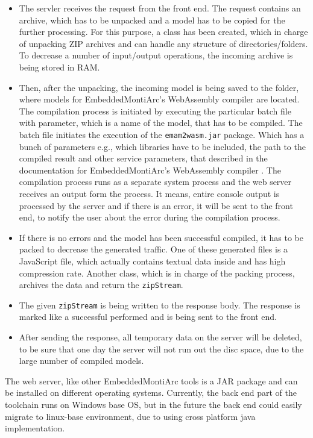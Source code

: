 \begin{itemize}
    \item The servler receives the request from the front end. The request contains an archive, which has to be unpacked and a model has to be copied for the further processing. For this purpose, a class has been created, which in charge of unpacking ZIP archives and can handle any structure of directories/folders. To decrease a number of input/output operations, the incoming archive is being stored in RAM.
    \item Then, after the unpacking, the incoming model is being saved to the folder, where models for EmbeddedMontiArc's WebAssembly compiler are located. The compilation process is initiated by executing the particular batch file with parameter, which is a name of the model, that has to be compiled. The batch file initiates the execution of the \texttt{emam2wasm.jar} package. Which has a bunch of parameters e.g., which libraries have to be included, the path to the compiled result and other service parameters, that described in the documentation for EmbeddedMontiArc's WebAssembly compiler \cite{EMAM2Wasm}. The compilation process runs as a separate system process and the web server receives an output form the process. It means, entire console output is processed by the server and if there is an error, it will be sent to the front end, to notify the user about the error during the compilation process.
    \item If there is no errors and the model has been successful compiled, it has to be packed to decrease the generated traffic. One of these generated files is a JavaScript file, which actually contains textual data inside and has high compression rate. Another class, which is in charge of the packing process, archives the data and return the \texttt{zipStream}.
    \item The given \texttt{zipStream} is being written to the response body. The response is marked like a successful performed and is being sent to the front end.
    \item After sending the response, all temporary data on the server will be deleted, to be sure that one day the server will not run out the disc space, due to the large number of compiled models.
\end{itemize}
The web server, like other EmbeddedMontiArc tools is a JAR package and can be installed on different operating systems. Currently, the back end part of the toolchain runs on Windows base OS, but in the future the back end could easily migrate to linux-base environment, due to using cross platform java implementation.

